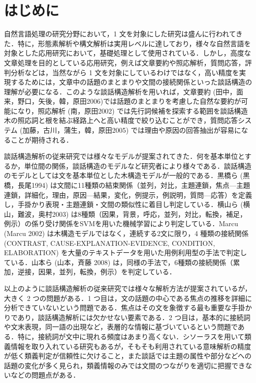 \documentclass[japanese]{jnlp_1.4}
\begin{document}
\maketitle

\vspace{0.5\baselineskip}

\section{はじめに}
\label{sec:mylabel1}

自然言語処理の研究分野において，1 文を対象にした研究は盛んに行われてきた．特に，形態素解析や構文解析は実用レベルに達しており，様々な自然言語を対象とした応用研究において，基礎処理として使用されている．しかし，高度な文章処理を目的としている応用研究，例えば文章要約や照応解析，質問応答，評判分析などは，当然ながら 1 文を対象にしているわけではなく，高い精度を実現するためには，文章中の話題のまとまりや文間の接続関係といった談話構造の理解が必要になる．このような談話構造解析を用いれば，文章要約 (田中，面来，野口，矢後，韓，原田2006)では話題のまとまりを考慮した自然な要約が可能になり，照応解析 (南，原田2002) では先行詞候補を探索する範囲を談話構造木の照応詞と根を結ぶ経路上へと高い精度で絞り込むことができ，質問応答システム (加藤，古川，蒲生，韓，原田2005) では理由や原因の回答抽出が容易になることが期待される．

談話構造解析の従来研究では様々なモデルが提案されてきた．何を基本単位とするか，単位間の関係，談話構造のモデルなど研究者により様々である．談話構造のモデルとしては文を基本単位とした木構造モデルが一般的である．黒橋ら (黒橋，長尾1994) は文間に11種類の結束関係（並列，対比，主題連鎖，焦点—主題連鎖，詳細化，理由，原因—結果，変化，例提示，例説明，質問—応答）を定義し，手掛かり表現・主題連鎖・文間の類似性に着目し判定している．横山ら (横山，難波，奥村2003) は8種類（因果，背景，呼応，並列，対比，転換，補足，例示）の係り受け関係をSVMを用いた機械学習により判定している．Marcu (Marcu 2002) は木構造モデルではなく，連続する2文に限り，4 種類の接続関係 (CONTRAST, CAUSE-EXPLANATION-EVIDENCE, CONDITION, ELABORATION) を大量のテキストデータを用いた用例利用型の手法で判定している．山本ら (山本，斉藤 2008) は，同様の手法で，6種類の接続関係（累加，逆接，因果，並列，転換，例示）を判定している．

以上のように談話構造解析の従来研究では様々な解析方法が提案されているが，大きく 2 つの問題がある．1 つ目は，文の話題の中心である焦点の推移を詳細に分析できていないという問題である．焦点はその文を象徴する最も重要な手掛かりであり，談話構造解析には欠かせない要素である．2 つ目は，基本的に接続詞や文末表現，同一語の出現など，表層的な情報に基づいているという問題である．特に，接続詞が文中に現れる頻度はあまり高くない．シソーラスを用いて類義情報を取り入れている研究もあるが，そもそも利用されている意味解析の精度が低く類義判定が信頼性に欠けること，また談話では主題の属性や部分などへの話題の変化が多く見られ，類義情報のみでは文間のつながりを適切に把握できないなどの問題点がある．
\end{document}
